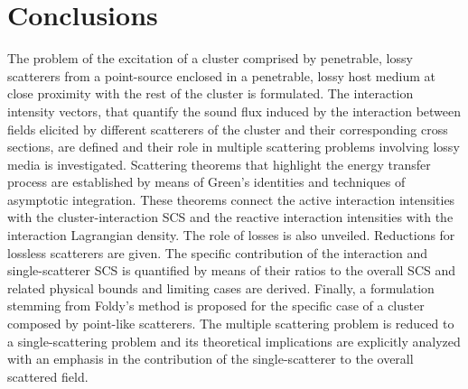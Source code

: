 \documentclass{article}
\begin{document}
\section{Conclusions}
%
The problem of the excitation of a cluster comprised by penetrable, lossy scatterers from a point-source enclosed in a penetrable, lossy host medium at close proximity with the rest of the cluster is formulated. The interaction intensity vectors, that quantify the sound flux induced by the interaction between fields elicited by different scatterers of the cluster and their corresponding cross sections, are defined and their role in multiple scattering problems involving lossy media is investigated. Scattering theorems that highlight the energy transfer process are established by means of Green's identities and techniques of asymptotic integration. These theorems connect the active interaction intensities with the cluster-interaction SCS and the reactive interaction intensities with the interaction Lagrangian density. The role of losses is also unveiled. Reductions for lossless scatterers are given. The specific contribution of the interaction and single-scatterer SCS is quantified by means of their ratios to the overall SCS and related physical bounds and limiting cases are derived. Finally, a formulation stemming from Foldy's method is proposed for the specific case of a cluster composed by point-like scatterers. The multiple scattering problem is reduced to a single-scattering problem and its theoretical implications are explicitly analyzed with an emphasis in the contribution of the single-scatterer to the overall scattered field.




\newpage

 







\end{document}
